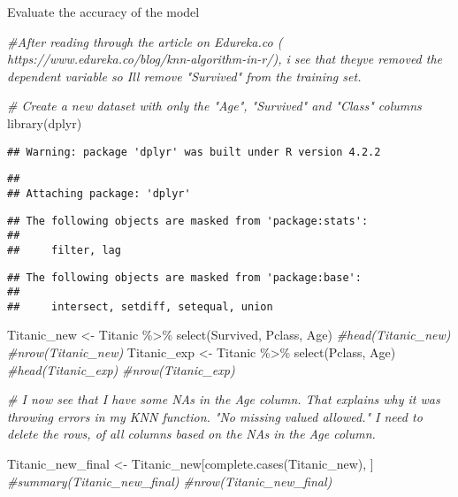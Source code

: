\documentclass[
  ignorenonframetext,
]{beamer}
\newenvironment{Shaded}{\begin{snugshade}}{\end{snugshade}}
\newcommand{\CommentTok}[1]{\textcolor[rgb]{0.56,0.35,0.01}{\textit{#1}}}
\newcommand{\FunctionTok}[1]{\textcolor[rgb]{0.00,0.00,0.00}{#1}}
\newcommand{\NormalTok}[1]{#1}
\newcommand{\OtherTok}[1]{\textcolor[rgb]{0.56,0.35,0.01}{#1}}
\newcommand{\SpecialCharTok}[1]{\textcolor[rgb]{0.00,0.00,0.00}{#1}}
\begin{document}
\begin{frame}[fragile]{Evaluate the accuracy of the model}
\begin{Shaded}
\begin{Highlighting}[]
\CommentTok{\#After reading through the article on Edureka.co ( https://www.edureka.co/blog/knn{-}algorithm{-}in{-}r/), i see that they\textquotesingle{}ve removed the dependent variable so I\textquotesingle{}ll remove "Survived" from the training set.  }

\CommentTok{\# Create a new dataset with only the "Age", "Survived" and "Class" columns}
\FunctionTok{library}\NormalTok{(dplyr)}
\end{Highlighting}
\end{Shaded}

\begin{verbatim}
## Warning: package 'dplyr' was built under R version 4.2.2
\end{verbatim}

\begin{verbatim}
## 
## Attaching package: 'dplyr'
\end{verbatim}

\begin{verbatim}
## The following objects are masked from 'package:stats':
## 
##     filter, lag
\end{verbatim}

\begin{verbatim}
## The following objects are masked from 'package:base':
## 
##     intersect, setdiff, setequal, union
\end{verbatim}

\begin{Shaded}
\begin{Highlighting}[]
\NormalTok{Titanic\_new }\OtherTok{\textless{}{-}}\NormalTok{ Titanic }\SpecialCharTok{\%\textgreater{}\%} \FunctionTok{select}\NormalTok{(Survived, Pclass, Age)}
\CommentTok{\#head(Titanic\_new)}
\CommentTok{\#nrow(Titanic\_new)}
\NormalTok{Titanic\_exp }\OtherTok{\textless{}{-}}\NormalTok{ Titanic }\SpecialCharTok{\%\textgreater{}\%} \FunctionTok{select}\NormalTok{(Pclass, Age)}
\CommentTok{\#head(Titanic\_exp)}
\CommentTok{\#nrow(Titanic\_exp)}

\CommentTok{\# I now see that I have some NAs in the Age column.  That explains why it was throwing errors in my KNN function.  "No missing valued allowed."  I need to delete the rows, of all columns based on the NA\textquotesingle{}s in the Age column.  }

\NormalTok{Titanic\_new\_final }\OtherTok{\textless{}{-}}\NormalTok{ Titanic\_new[}\FunctionTok{complete.cases}\NormalTok{(Titanic\_new), ]}
\CommentTok{\#summary(Titanic\_new\_final)}
\CommentTok{\#nrow(Titanic\_new\_final)}


\end{Highlighting}
\end{Shaded}
\end{frame}
\end{document}
